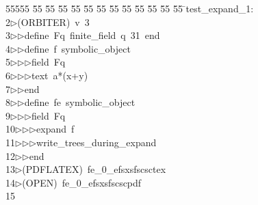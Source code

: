 %
%
\begin{tabbing}
55555 \= 55 \= 55 \= 55 \= 55 \= 55 \= 55 \= 55 \= 55 \= 55 \= 55 \= 55 \= 55 \= \>test\_expand\_1:\\[0pt]
2\>$\triangleright$\>(ORBITER)\ v\ 3\ \\[0pt]
3\>$\triangleright$\>$\triangleright$\>define\ Fq\ finite\_field\ q\ 31\ end\ \\[0pt]
4\>$\triangleright$\>$\triangleright$\>define\ f\ symbolic\_object\ \\[0pt]
5\>$\triangleright$\>$\triangleright$\>$\triangleright$\>field\ Fq\ \\[0pt]
6\>$\triangleright$\>$\triangleright$\>$\triangleright$\>text\ a*(x+y)\ \\[0pt]
7\>$\triangleright$\>$\triangleright$\>end\ \\[0pt]
8\>$\triangleright$\>$\triangleright$\>define\ fe\ symbolic\_object\ \\[0pt]
9\>$\triangleright$\>$\triangleright$\>$\triangleright$\>field\ Fq\ \\[0pt]
10\>$\triangleright$\>$\triangleright$\>$\triangleright$\>expand\ f\ \\[0pt]
11\>$\triangleright$\>$\triangleright$\>$\triangleright$\>write\_trees\_during\_expand\ \\[0pt]
12\>$\triangleright$\>$\triangleright$\>end\\[0pt]
13\>$\triangleright$\>(PDFLATEX)\ fe\_0\_efsxsfscsctex\\[0pt]
14\>$\triangleright$\>(OPEN)\ fe\_0\_efsxsfscscpdf\\[0pt]
15\>\end{tabbing}
